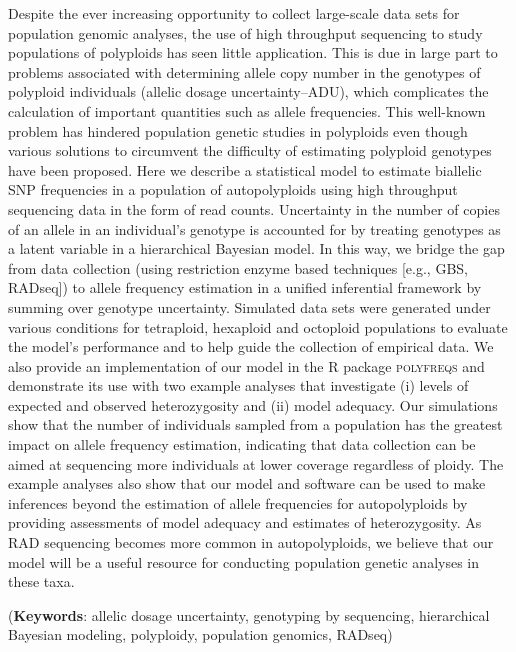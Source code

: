 \documentclass[11pt,english,letterpaper,oneside]{article}
\begin{document}
Despite the ever increasing opportunity to collect large-scale data sets for population genomic analyses, the use of high throughput sequencing to study populations of polyploids has seen little application. This is due in large part to problems associated with determining allele copy number in the genotypes of polyploid individuals (allelic dosage uncertainty--ADU), which complicates the calculation of important quantities such as allele frequencies. This well-known problem has hindered population genetic studies in polyploids even though various solutions to circumvent the difficulty of estimating polyploid genotypes have been proposed. Here we describe a statistical model to estimate biallelic SNP frequencies in a population of autopolyploids using high throughput sequencing data in the form of read counts. Uncertainty in the number of copies of an allele in an individual's genotype is accounted for by treating genotypes as a latent variable in a hierarchical Bayesian model. In this way, we bridge the gap from data collection (using restriction enzyme based techniques [e.g., GBS, RADseq]) to allele frequency estimation in a unified inferential framework by summing over genotype uncertainty. Simulated data sets were generated under various conditions for tetraploid, hexaploid and octoploid populations to evaluate the model's performance and to help guide the collection of empirical data. We also provide an implementation of our model in the R package \textsc{polyfreqs} and demonstrate its use with two example analyses that investigate (i) levels of expected and observed heterozygosity and (ii) model adequacy. Our simulations show that the number of individuals sampled from a population has the greatest impact on allele frequency estimation, indicating that data collection can be aimed at sequencing more individuals at lower coverage regardless of ploidy. The example analyses also show that our model and software can be used to make inferences beyond the estimation of allele frequencies for autopolyploids by providing assessments of model adequacy and estimates of heterozygosity. As RAD sequencing becomes more common in autopolyploids, we believe that our model will be a useful resource for conducting population genetic analyses in these taxa.
\vspace{0.25in}

\noindent (\textbf{Keywords}: allelic dosage uncertainty, genotyping by sequencing, hierarchical Bayesian modeling, polyploidy, population genomics, RADseq)
\vspace{0.25in}
\end{document}
